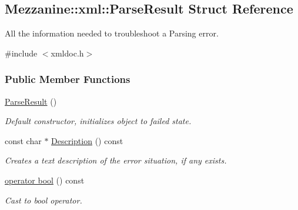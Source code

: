 \hypertarget{structMezzanine_1_1xml_1_1ParseResult}{
\subsection{Mezzanine::xml::ParseResult Struct Reference}
\label{structMezzanine_1_1xml_1_1ParseResult}
}


All the information needed to troubleshoot a Parsing error.  




{\ttfamily \#include $<$xmldoc.h$>$}

\subsubsection*{Public Member Functions}
\begin{DoxyCompactItemize}
\item 
\hypertarget{structMezzanine_1_1xml_1_1ParseResult_a93c9d88aba412ed7078a302b2ba808cd}{
\hyperlink{structMezzanine_1_1xml_1_1ParseResult_a93c9d88aba412ed7078a302b2ba808cd}{ParseResult} ()}
\label{structMezzanine_1_1xml_1_1ParseResult_a93c9d88aba412ed7078a302b2ba808cd}

\begin{DoxyCompactList}\small\item\em Default constructor, initializes object to failed state. \item\end{DoxyCompactList}\item 
const char $\ast$ \hyperlink{structMezzanine_1_1xml_1_1ParseResult_a212f19dc618fbb4adc1e438cdf0fef6c}{Description} () const 
\begin{DoxyCompactList}\small\item\em Creates a text description of the error situation, if any exists. \item\end{DoxyCompactList}\item 
\hyperlink{structMezzanine_1_1xml_1_1ParseResult_a19a33c5790df64a8a4da254f08bc73cb}{operator bool} () const 
\begin{DoxyCompactList}\small\item\em Cast to bool operator. \item\end{DoxyCompactList}\end{DoxyCompactItemize}
